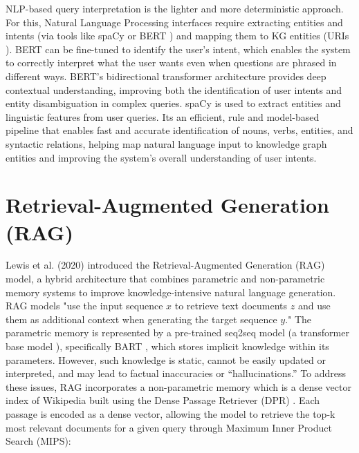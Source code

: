 \documentclass[conference]{IEEEtran}
\begin{document}
\noindent
NLP-based query interpretation is the lighter and more deterministic approach. For this, Natural Language Processing interfaces require extracting entities and intents (via tools like spaCy \cite{honnibal2020spacy} or BERT \cite{devlin2019bert}) and mapping them to KG entities (URIs \cite{semanticweb2024slides}). BERT can be fine-tuned to identify the user’s intent, which enables the system to correctly interpret what the user wants even when questions are phrased in different ways. BERT's \cite{devlin2019bert} bidirectional transformer architecture provides deep contextual understanding, improving both the identification of user intents and entity disambiguation in complex queries. spaCy \cite{honnibal2020spacy} is used to extract entities and linguistic features from user queries. Its an efficient, rule and model-based pipeline that enables fast and accurate identification of nouns, verbs, entities, and syntactic relations, helping map natural language input to knowledge graph entities and improving the system's overall understanding of user intents.


\section{Retrieval-Augmented Generation (RAG)}

\noindent
Lewis et al. (2020) \cite{lewis2020rag} introduced the Retrieval-Augmented Generation (RAG) model, a hybrid architecture that combines parametric and non-parametric memory systems to improve knowledge-intensive natural language generation. RAG models "use the input sequence $x$ to retrieve text documents $z$ and use them
as additional context when generating the target sequence $y$."
The parametric memory is represented by a pre-trained seq2seq model \cite{sutskever2014sequence} (a transformer base model \cite{vaswani2017attention}), specifically BART \cite{lewis2019bart}, which stores implicit knowledge within its parameters. However, such knowledge is static, cannot be easily updated or interpreted, and may lead to factual inaccuracies or “hallucinations.” To address these issues, RAG incorporates a non-parametric memory which is a dense vector index of Wikipedia built using the Dense Passage Retriever (DPR) \cite{karpukhin2020dense_passage_retrieval}. Each passage is encoded as a dense vector, allowing the model to retrieve the top-k most relevant documents for a given query through Maximum Inner Product Search (MIPS):
\end{document}
